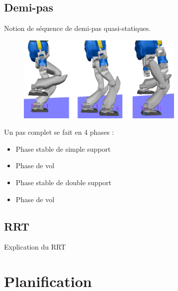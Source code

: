 \documentclass{beamer}
\begin{document}
\subsection*{Demi-pas}
\begin{frame}
  \begin{center}
    Notion de séquence de demi-pas quasi-statiques.
    \begin{figure}
      \includegraphics[width=8cm]{./images/HalfStep.png}\\
    \end{figure}
   \end{center}
  Un pas complet se fait en 4 phases :
  \begin{small}
    \begin{itemize}
    \item Phase stable de simple support
    \item Phase de vol
    \item Phase stable de double support
    \item Phase de vol
    \end{itemize}
    \end{small}
\end{frame}

\subsection*{RRT}
\begin{frame}
Explication du RRT
\end{frame}


\section{Planification}
\end{document}
